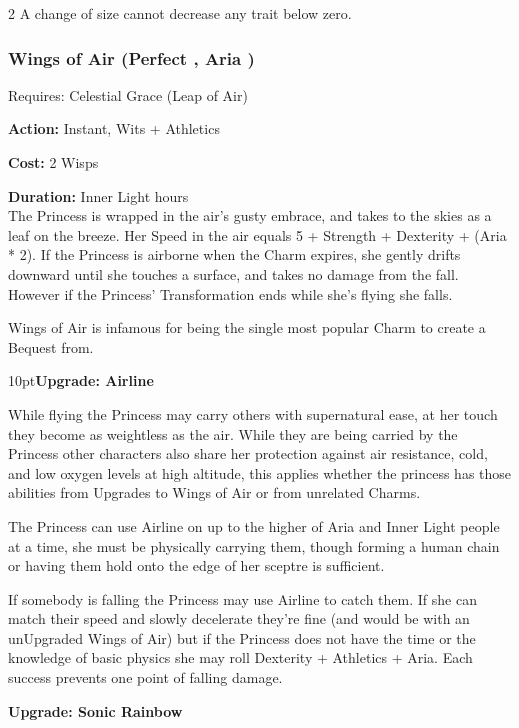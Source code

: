\begin{multicols}{2}
A change of size cannot decrease any trait below zero. 

\subsubsection*{Wings of Air (Perfect \textbullet\textbullet\textbullet\textbullet, Aria \textbullet\textbullet\textbullet)}

\noindent Requires: Celestial Grace (Leap of Air)

\noindent \textbf{Action:} Instant, Wits + Athletics

\noindent \textbf{Cost:} 2 Wisps

\noindent \textbf{Duration:} Inner Light hours \\

\noindent The Princess is wrapped in the air's gusty embrace, and takes to the skies as a leaf on the breeze. Her Speed in the air equals 5 + Strength + Dexterity + (Aria * 2). If the Princess is airborne when the Charm expires, she gently drifts downward until she touches a surface, and takes no damage from the fall. However if the Princess' Transformation ends while she's flying she falls.

Wings of Air is infamous for being the single most popular Charm to create a Bequest from. 

\begin{myindentpar}{10pt}\textbf{Upgrade: Airline}

While flying the Princess may carry others with supernatural ease, at her touch they become as weightless as the air. While they are being carried by the Princess other characters also share her protection against air resistance, cold, and low oxygen levels at high altitude, this applies whether the princess has those abilities from Upgrades to Wings of Air or from unrelated Charms.

The Princess can use Airline on up to the higher of Aria and Inner Light people at a time, she must be physically carrying them, though forming a human chain or having them hold onto the edge of her sceptre is sufficient. 

If somebody is falling the Princess may use Airline to catch them. If she can match their speed and slowly decelerate they're fine (and would be with an unUpgraded Wings of Air) but if the Princess does not have the time or the knowledge of basic physics she may roll Dexterity + Athletics + Aria. Each success prevents one point of falling damage. 

\textbf{Upgrade: Sonic Rainbow}


\end{myindentpar}
\end{multicols}
